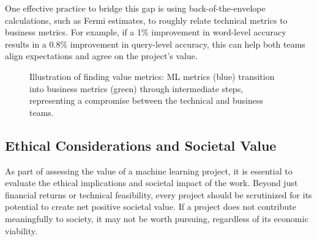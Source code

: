\documentclass[12pt,openany, draft]{book}
\begin{document}
One effective practice to bridge this gap is using back-of-the-envelope calculations, such as Fermi estimates, to roughly relate technical metrics to business metrics. For example, if a 1\% improvement in word-level accuracy results in a 0.8\% improvement in query-level accuracy, this can help both teams align expectations and agree on the project’s value.

\begin{figure}[H]
    \centering
    \caption{Illustration of finding value metrics: ML metrics (blue) transition into business metrics (green) through intermediate steps, representing a compromise between the technical and business teams.}
    \label{fig:value_metrics}
\end{figure}


\subsection{Ethical Considerations and Societal Value}

As part of assessing the value of a machine learning project, it is essential to evaluate the ethical implications and societal impact of the work. Beyond just financial returns or technical feasibility, every project should be scrutinized for its potential to create net positive societal value. If a project does not contribute meaningfully to society, it may not be worth pursuing, regardless of its economic viability. \newline
\end{document}
